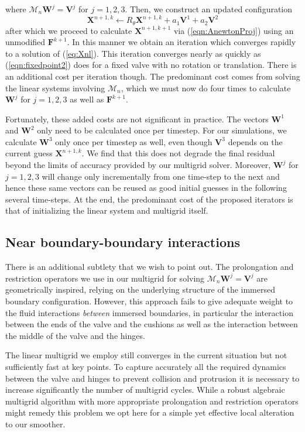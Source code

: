 \documentclass[preprint,12pt]{elsarticle}
\begin{document}
where $\mathcal{M}_n\mathbf{W}^j = \mathbf{V}^j$ for $j=1,2,3$.
Then, we construct an updated configuration 
\begin{equation}
\mathbf{X}^{n+1,k} \leftarrow R_{\theta}\mathbf{X}^{n+1,k}+a_1\mathbf{V}^1+a_2\mathbf{V}^2
\label{eqn:Rotate}
\end{equation}
after which we proceed to calculate $\mathbf{X}^{n+1,k+1}$ via (\ref{eqn:AnewtonProj}) using an unmodified $\mathbf{F}^{k+1}$.
In this manner we obtain an iteration which converges rapidly to a solution of (\ref{eq:Xnl}).
This iteration converges nearly as quickly as (\ref{eqn:fixedpoint2}) does for a fixed valve with no rotation or translation. There is an additional cost per iteration though. The predominant cost comes from solving the linear systems involving $\mathcal{M}_n$, which we must now do four times to calculate $\mathbf{W}^j$ for $j=1,2,3$ as well as $\mathbf{F}^{k+1}$.

Fortunately, these added costs are not significant in practice. The vectors $\mathbf{W}^1$ and $\mathbf{W}^2$ only need to be calculated once per timestep. For our simulations, we calculate $\mathbf{W}^3$ only once per timestep as well, even though $\mathbf{V}^3$ depends on the current guess $\mathbf{X}^{n+1,k}$. We find that this does not degrade the final residual beyond the limits of accuracy provided by our multigrid solver. Moreover,  $\mathbf{W}^j$ for $j=1,2,3$ will change only incrementally from one time-step to the next and hence these same vectors can be reused  as good initial guesses in the following several time-steps. 
At the end, the predominant cost of  the proposed iterators is that of initializing the linear system and multigrid itself.

\subsection{Near boundary-boundary interactions}
There is an additional subtlety that we wish to point out. The prolongation and restriction operators we use in our multigrid for solving 
$\mathcal{M}_n\mathbf{W}^j = \mathbf{V}^j$  are geometrically inspired, relying on the underlying structure of the immersed boundary configuration. However, this approach fails to give adequate weight to the fluid interactions \textit{between} immersed boundaries, in particular the interaction between the ends of the valve and the cushions as well as the interaction between the middle of the valve and the hinges.

The linear multigrid we employ still converges in the current situation but not sufficiently fast at key points.  
To capture accurately all the required dynamics between the valve and hinges to prevent collision and protrusion
it is necessary to increase significantly the number of multigrid cycles. While a robust algebraic multigrid algorithm with more
appropriate  prolongation and restriction operators might remedy this problem we opt here for a simple yet effective local alteration to our smoother.
\end{document}
